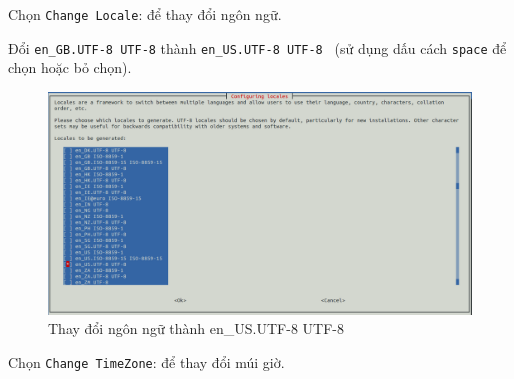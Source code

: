 \begin{list}{--}{}
\item Chọn \verb|Change Locale|: để thay đổi ngôn ngữ.

Đổi \verb|en_GB.UTF-8 UTF-8| thành \verb|en_US.UTF-8 UTF-8 | (sử dụng dấu cách \verb|space| để chọn hoặc bỏ chọn).
\begin{figure}[!h]
\begin{center}
\includegraphics[scale=.35]{setup-os/images/lang}
\end{center}
\caption{Thay đổi ngôn ngữ thành \textsf{en\_US.UTF-8 UTF-8}}
\end{figure}
\item Chọn \verb|Change TimeZone|: để thay đổi múi giờ.


\end{list}
